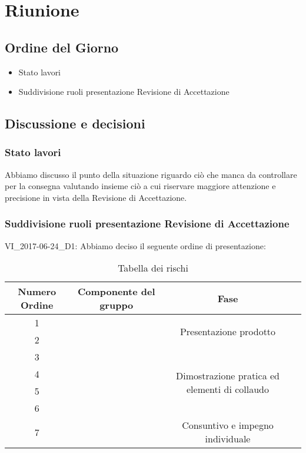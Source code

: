 \section{Riunione}
\subsection{Ordine del Giorno}
\begin{itemize}
	\item Stato lavori
	\item Suddivisione ruoli presentazione Revisione di Accettazione
\end{itemize}

\subsection{Discussione e decisioni}

\subsubsection{Stato lavori}
Abbiamo discusso il punto della situazione riguardo ciò che manca da controllare per la consegna valutando insieme ciò a cui riservare maggiore attenzione e precisione in vista della Revisione di Accettazione.

\subsubsection{Suddivisione ruoli presentazione Revisione di Accettazione}
VI\_2017-06-24\_D1: Abbiamo deciso il seguente ordine di presentazione:
\begin{table}[H]
	\centering
	\begin{tabular}{|c|c|c|c|}
		\hline
		\textbf{Numero Ordine} &
		\textbf{Componente del gruppo} &
		\textbf{Fase} \\
		\hline
		1 & \lorenzo & \multirow{2}{*}{Presentazione prodotto}  \\\cline{1-2}
		2 & \bea & \\
		\hline
		3 & \alice & \multirow{4}{*}{Dimostrazione pratica ed elementi di collaudo} \\\cline{1-2}
		4 & \tommy & \\\cline{1-2}
		5 & \nick & \\\cline{1-2}
		6 & \marco & \\
		\hline
		7 &  \mattia & Consuntivo e impegno individuale \\
		\hline
	\end{tabular}
	\caption{Tabella dei rischi}
\end{table}


\clearpage
